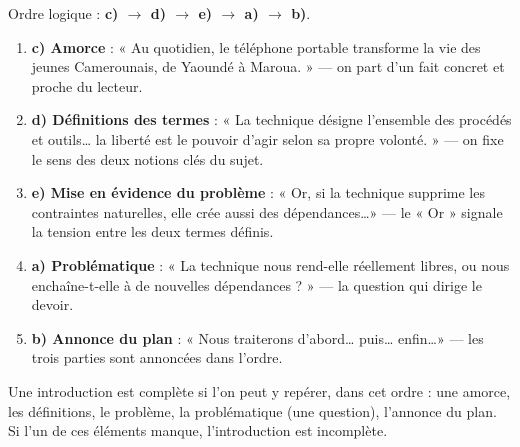 \documentclass[11pt]{article}
\begin{document}
\begin{corrige}
Ordre logique : \textbf{c) $\rightarrow$ d) $\rightarrow$ e) $\rightarrow$ a) $\rightarrow$ b)}.
\begin{enumerate}
\item \textbf{c) Amorce} : « Au quotidien, le téléphone portable transforme la vie des jeunes Camerounais, de Yaoundé à Maroua. » — on part d'un fait concret et proche du lecteur.
\item \textbf{d) Définitions des termes} : « La technique désigne l'ensemble des procédés et outils\ldots{} la liberté est le pouvoir d'agir selon sa propre volonté. » — on fixe le sens des deux notions clés du sujet.
\item \textbf{e) Mise en évidence du problème} : « Or, si la technique supprime les contraintes naturelles, elle crée aussi des dépendances\ldots » — le « Or » signale la tension entre les deux termes définis.
\item \textbf{a) Problématique} : « La technique nous rend-elle réellement libres, ou nous enchaîne-t-elle à de nouvelles dépendances ? » — la question qui dirige le devoir.
\item \textbf{b) Annonce du plan} : « Nous traiterons d'abord\ldots{} puis\ldots{} enfin\ldots » — les trois parties sont annoncées dans l'ordre.
\end{enumerate}
\begin{methode}
Une introduction est complète si l'on peut y repérer, dans cet ordre : une amorce, les définitions, le problème, la problématique (une question), l'annonce du plan. Si l'un de ces éléments manque, l'introduction est incomplète.
\end{methode}
\end{corrige}
\end{document}
